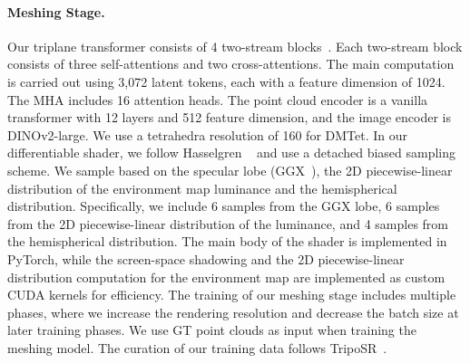 \paragraph{Meshing Stage.}
Our triplane transformer consists of 4 two-stream blocks~\cite{huang2024pointinfinity}. Each two-stream block consists of three self-attentions and two cross-attentions. The main computation is carried out using 3,072 latent tokens, each with a feature dimension of 1024. The MHA includes 16 attention heads. The point cloud encoder is a vanilla transformer with 12 layers and 512 feature dimension, and the image encoder is DINOv2-large. We use a tetrahedra resolution of 160 for DMTet. In our differentiable shader, we follow Hasselgren \etal~\cite{hasselgren2022nvdiffrecmc} and use a detached biased sampling scheme. We sample based on the specular lobe (GGX~\cite{Walter2007}), the 2D piecewise-linear distribution of the environment map luminance and the hemispherical distribution.  Specifically, we include 6 samples from the GGX lobe, 6 samples from the 2D piecewise-linear distribution of the luminance, and 4 samples from the hemispherical distribution. The main body of the shader is implemented in PyTorch, while the screen-space shadowing and the 2D piecewise-linear distribution computation for the environment map are implemented as custom CUDA kernels for efficiency. The training of our meshing stage includes multiple phases, where we increase the rendering resolution and decrease the batch size at later training phases. We use GT point clouds as input when training the meshing model. The curation of our training data follows TripoSR~\cite{TripoSR2024}. 